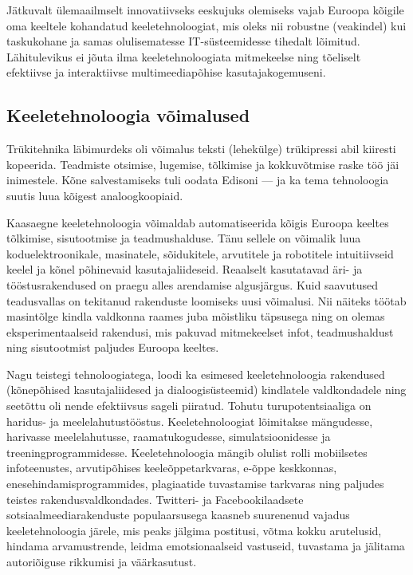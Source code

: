 \begin{multicols}{2}
Jätkuvalt ülemaailmselt innovatiivseks eeskujuks olemiseks vajab Euroopa kõigile oma keeltele kohandatud keeletehno\-loogiat, mis oleks nii robustne (veakindel) kui taskukohane ja samas olulisematesse IT-süsteemidesse tihedalt lõimitud. 
Lähi\-tulevikus ei jõuta ilma keeletehno\-loogiata mitmekeelse ning tõeliselt efektiivse ja interaktiivse multimeediapõhise kasutaja\-kogemuseni.

\subsection{Keeletehnoloogia võimalused}

Trükitehnika läbimurdeks oli võimalus teksti (lehekülge) trükipressi abil kiiresti kopeerida. 
Teadmiste otsimise, lugemise, tõlkimise ja kokkuvõtmise raske töö jäi inimestele. 
Kõne salvestamiseks tuli oodata Edisoni --- ja ka tema tehnoloogia suutis luua kõigest analoog\-koopiaid.

Kaasaegne keeletehnoloogia võimaldab automatiseerida kõigis Euroopa keeltes tõlkimise, sisutootmise ja teadmushalduse. 
Tänu sellele on võimalik luua koduelektroonikale, masinatele, sõidukitele, arvutitele ja robotitele intui\-tiivseid keelel ja kõnel põhinevaid kasutajaliideseid. 
Reaalselt kasutatavad äri- ja tööstusrakendused on praegu alles arendamise algusjärgus. 
Kuid saavutused teadusvallas on tekitanud rakenduste loo\-miseks uusi võimalusi. 
Nii näiteks töötab masintõlge kindla valdkonna raames juba mõistliku täpsusega ning on olemas eksperi\-mentaalseid rakendusi, mis pakuvad mitmekeelset infot, teadmushaldust ning sisutootmist paljudes Euroopa keeltes.

Nagu teistegi tehnoloogiatega, loodi ka esimesed keeletehnoloogia rakendused (kõnepõhised kasutajaliidesed ja dia\-loogi\-süsteemid) kindlatele valdkondadele ning seetõttu oli nende efektiivsus sageli pii\-ratud. 
Tohutu turupotentsiaaliga on haridus- ja meelelahutustööstus. 
Keele\-tehnoloogiat lõimitakse mängudesse, harivasse meelelahutusse, raamatukogudesse, simulatsioonidesse ja treeningprogrammidesse. 
Keeletehnoloogia mängib olulist rolli mobiilsetes infoteenustes, arvutipõhises keele\-õppetarkvaras, e-õppe keskkonnas, enese\-hindamisprogrammides, plagiaatide tuvastamise tarkvaras ning paljudes teistes rakendusvaldkondades. 
Twitteri- ja Facebookilaadsete sotsiaalmeediarakenduste populaarsusega kaasneb suurenenud vajadus keeletehnoloogia järele, mis peaks jälgima postitusi, võtma kokku arutelusid, hindama arvamustrende, leidma emotsionaalseid vastuseid, tuvastama ja jälitama autoriõiguse rikkumisi ja väärkasutust.


\end{multicols}
